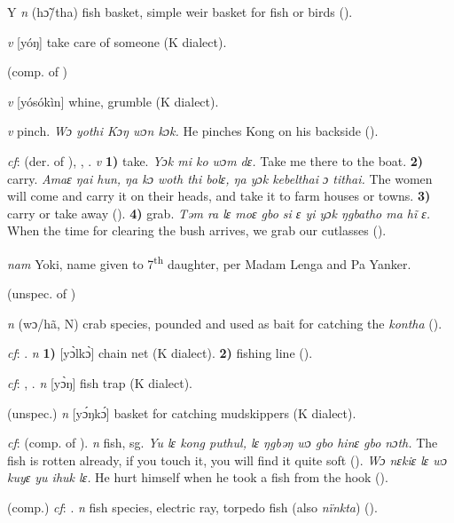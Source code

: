 \begin{letter}{Y}
 \textit{n} (hɔ̃/tha) fish basket, simple weir basket for fish or birds (\citealt{Pichl1967}). 

 \textit{v} [yóŋ] take care of someone (K dialect). 

 (comp. of ) 

 \textit{v} [yósókìn] whine, grumble (K dialect). 

 \textit{v} pinch. \textit{Wɔ yothi Kɔŋ wɔn kɔk.} He pinches Kong on his backside (\citealt{Pichl1967}).

 \textit{cf}:  (der. of ), , . \textit{v} \textbf{1)} take. \textit{Yɔk mi ko wɔm dɛ.} Take me there to the boat. \textbf{2)} carry. \textit{Amaɛ ŋai hun, ŋa kɔ woth thi bolɛ, ŋa yɔk kebelthai ɔ tithai.} The women will come and carry it on their heads, and take it to farm houses or towns. \textbf{3)} carry or take away (\citealt{Pichl1967}). \textbf{4)} grab. \textit{Təm ra lɛ moɛ gbo si ɛ yi yɔk ŋgbatho ma hĩ ɛ.} When the time for clearing the bush arrives, we grab our cutlasses (\citealt{Pichl1967}). 

 \textit{nam} Yoki, name given to 7\textsuperscript{th} daughter, per Madam Lenga and Pa Yanker.

 (unspec. of ) 

 \textit{n} (wɔ/hã, N) crab species, pounded and used as bait for catching the \textit{kontha} (\citealt{Pichl1967}). 

 \textit{cf}: . \textit{n} \textbf{1)} [yɔ̀lkɔ̀] chain net (K dialect). \textbf{2)} fishing line (\citealt{Pichl1967}). 

 \textit{cf}: , . \textit{n} [yɔ̀ŋ] fish trap (K dialect). 

 (unspec.) \textit{n} [yɔ́ŋkɔ́] basket for catching mudskippers (K dialect).

 \textit{cf}:  (comp. of ). \textit{n} fish, sg. \textit{Yu lɛ kong puthul, lɛ ŋgbəŋ wɔ gbo hinɛ gbo nɔth.} The fish is rotten already, if you touch it, you will find it quite soft (\citealt{Pichl1967}). \textit{Wɔ nɛkiɛ lɛ wɔ kuyɛ yu ihuk lɛ.} He hurt himself when he took a fish from the hook (\citealt{Pichl1967}).

 (comp.) \textit{cf}: . \textit{n} fish species, electric ray, torpedo fish (also \textit{nïnkta}) (\citealt{Pichl1967}).


\end{letter}

